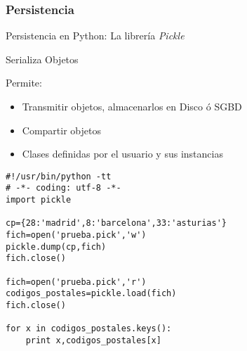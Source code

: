 \documentclass[ucs]{beamer}
\begin{document}
\begin{frame}[fragile]
\frametitle{Persistencia}
Persistencia en Python: La librería \emph{Pickle}

Serializa Objetos

Permite:
  \begin{itemize}
\item Transmitir objetos, almacenarlos en Disco ó SGBD
\item Compartir objetos
\item Clases definidas por el usuario y sus instancias
  \end{itemize}
\end{frame}



\begin{frame}[fragile]

  \begin{scriptsize}
\begin{verbatim}
#!/usr/bin/python -tt
# -*- coding: utf-8 -*-
import pickle

cp={28:'madrid',8:'barcelona',33:'asturias'}
fich=open('prueba.pick','w')
pickle.dump(cp,fich)
fich.close()

fich=open('prueba.pick','r')
codigos_postales=pickle.load(fich)
fich.close()

for x in codigos_postales.keys():
    print x,codigos_postales[x]

\end{verbatim}
  \end{scriptsize}


\end{frame}





\end{document}

